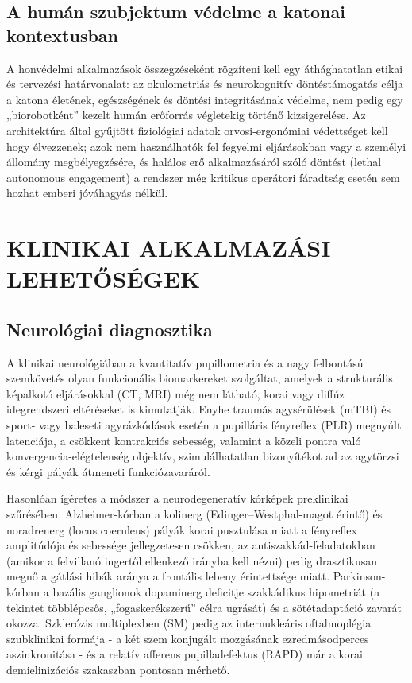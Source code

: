 \documentclass[12pt,a4paper,oneside]{book}
\begin{document}
\subsection{A humán szubjektum védelme a katonai kontextusban}

A honvédelmi alkalmazások összegzéseként rögzíteni kell egy áthághatatlan etikai és tervezési határvonalat: az okulometriás és neurokognitív döntéstámogatás célja a katona életének, egészségének és döntési integritásának védelme, nem pedig egy „biorobotként” kezelt humán erőforrás végletekig történő kizsigerelése. Az architektúra által gyűjtött fiziológiai adatok orvosi-ergonómiai védettséget kell hogy élvezzenek; azok nem használhatók fel fegyelmi eljárásokban vagy a személyi állomány megbélyegzésére, és halálos erő alkalmazásáról szóló döntést (lethal autonomous engagement) a rendszer még kritikus operátori fáradtság esetén sem hozhat emberi jóváhagyás nélkül.

\section{KLINIKAI ALKALMAZÁSI LEHETŐSÉGEK}

\subsection{Neurológiai diagnosztika}

A klinikai neurológiában a kvantitatív pupillometria és a nagy felbontású szemkövetés olyan funkcionális biomarkereket szolgáltat, amelyek a strukturális képalkotó eljárásokkal (CT, MRI) még nem látható, korai vagy diffúz idegrendszeri eltéréseket is kimutatják. Enyhe traumás agysérülések (mTBI) és sport- vagy baleseti agyrázkódások esetén a pupilláris fényreflex (PLR) megnyúlt latenciája, a csökkent kontrakciós sebesség, valamint a közeli pontra való konvergencia-elégtelenség objektív, szimulálhatatlan bizonyítékot ad az agytörzsi és kérgi pályák átmeneti funkciózavaráról.

Hasonlóan ígéretes a módszer a neurodegeneratív kórképek preklinikai szűrésében. Alzheimer-kórban a kolinerg (Edinger--Westphal-magot érintő) és noradrenerg (locus coeruleus) pályák korai pusztulása miatt a fényreflex amplitúdója és sebessége jellegzetesen csökken, az antiszakkád-feladatokban (amikor a felvillanó ingertől ellenkező irányba kell nézni) pedig drasztikusan megnő a gátlási hibák aránya a frontális lebeny érintettsége miatt. Parkinson-kórban a bazális ganglionok dopaminerg deficitje szakkádikus hipometriát (a tekintet többlépcsős, „fogaskerékszerű” célra ugrását) és a sötétadaptáció zavarát okozza. Szklerózis multiplexben (SM) pedig az internukleáris oftalmoplégia szubklinikai formája - a két szem konjugált mozgásának ezredmásodperces aszinkronitása - és a relatív afferens pupilladefektus (RAPD) már a korai demielinizációs szakaszban pontosan mérhető.
\end{document}
